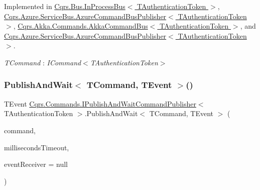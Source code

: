 Implemented in \hyperlink{classCqrs_1_1Bus_1_1InProcessBus_a38c0684e313f42bfb36b40703db94ccb_a38c0684e313f42bfb36b40703db94ccb}{Cqrs.\+Bus.\+In\+Process\+Bus$<$ T\+Authentication\+Token $>$}, \hyperlink{classCqrs_1_1Azure_1_1ServiceBus_1_1AzureCommandBusPublisher_ab63045bffba3925270d0087e6fa4366f_ab63045bffba3925270d0087e6fa4366f}{Cqrs.\+Azure.\+Service\+Bus.\+Azure\+Command\+Bus\+Publisher$<$ T\+Authentication\+Token $>$}, \hyperlink{classCqrs_1_1Akka_1_1Commands_1_1AkkaCommandBus_a8e1291f0259ac80e393c02bb119159a5_a8e1291f0259ac80e393c02bb119159a5}{Cqrs.\+Akka.\+Commands.\+Akka\+Command\+Bus$<$ T\+Authentication\+Token $>$}, and \hyperlink{classCqrs_1_1Azure_1_1ServiceBus_1_1AzureCommandBusPublisher_ab63045bffba3925270d0087e6fa4366f_ab63045bffba3925270d0087e6fa4366f}{Cqrs.\+Azure.\+Service\+Bus.\+Azure\+Command\+Bus\+Publisher$<$ T\+Authentication\+Token $>$}.

\begin{Desc}
\item[Type Constraints]\begin{description}
\item[{\em T\+Command} : {\em I\+Command$<$T\+Authentication\+Token$>$}]\end{description}
\end{Desc}
\mbox{\label{interfaceCqrs_1_1Commands_1_1IPublishAndWaitCommandPublisher_ad3761879cf9e09c9e89cabf8067b6de4_ad3761879cf9e09c9e89cabf8067b6de4}} 
\subsubsection{\texorpdfstring{Publish\+And\+Wait$<$ T\+Command, T\+Event $>$()}{PublishAndWait< TCommand, TEvent >()}\hspace{0.1cm}{\footnotesize\ttfamily [2/6]}}
{\footnotesize\ttfamily T\+Event \hyperlink{interfaceCqrs_1_1Commands_1_1IPublishAndWaitCommandPublisher}{Cqrs.\+Commands.\+I\+Publish\+And\+Wait\+Command\+Publisher}$<$ T\+Authentication\+Token $>$.Publish\+And\+Wait$<$ T\+Command, T\+Event $>$ (\begin{DoxyParamCaption}\item[{T\+Command}]{command,  }\item[{int}]{milliseconds\+Timeout,  }\item[{\hyperlink{interfaceCqrs_1_1Events_1_1IEventReceiver}{I\+Event\+Receiver}$<$ T\+Authentication\+Token $>$}]{event\+Receiver = {\ttfamily null} }\end{DoxyParamCaption})}



